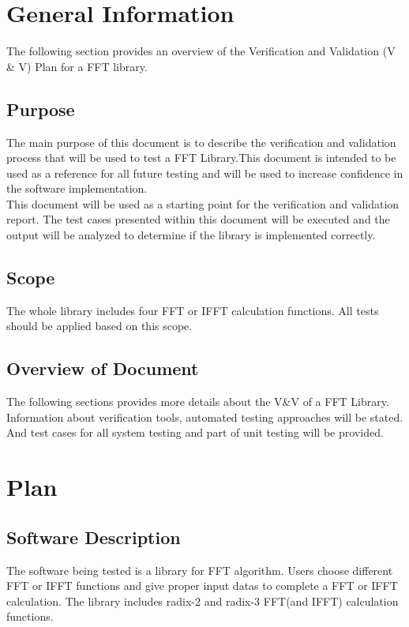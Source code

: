 \documentclass[12pt, titlepage]{article}
\begin{document}
\section{General Information}
The following section provides an overview of the Verification and
Validation (V \& V) Plan for a FFT library. 

\subsection{Purpose}
The main purpose of this document is to describe the verification and
validation process that will be used to test a FFT Library.This
 document is intended to be used as a reference for
all future testing and will be used
to increase confidence in the software implementation.\\
This document will be used as a starting point for the verification
and validation report.  The test cases presented within this document
will be executed and the output will be analyzed to determine if the
library is implemented correctly.



\subsection{Scope}
The whole library includes four FFT or IFFT calculation functions. All tests should be applied based on this scope.

\subsection{Overview of Document}
The following sections provides more details about the V\&V of a FFT Library. Information about verification tools, automated testing approaches will be stated. And
test cases for all system testing and part of unit testing will be provided.
\section{Plan}
	
\subsection{Software Description}
The software being tested is a library for FFT algorithm. Users choose
different  FFT or IFFT functions and give proper input datas  to complete a FFT or IFFT calculation. 
The library includes radix-2 and radix-3 FFT(and IFFT) calculation functions.
\end{document}
